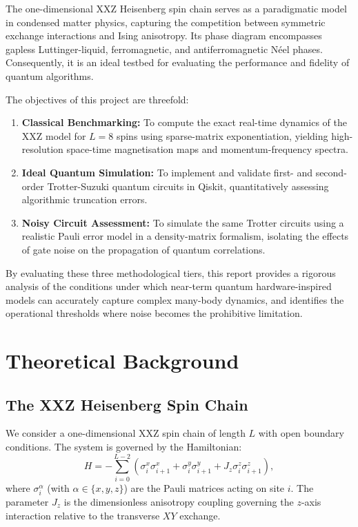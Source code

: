 \documentclass[11pt,a4paper]{article}
\begin{document}
The one-dimensional XXZ Heisenberg spin chain serves as a paradigmatic model in condensed matter physics, capturing the competition between symmetric exchange interactions and Ising anisotropy. Its phase diagram encompasses gapless Luttinger-liquid, ferromagnetic, and antiferromagnetic N\'eel phases. Consequently, it is an ideal testbed for evaluating the performance and fidelity of quantum algorithms.

The objectives of this project are threefold:
\begin{enumerate}
    \item \textbf{Classical Benchmarking:} To compute the exact real-time dynamics of the XXZ model for $L=8$ spins using sparse-matrix exponentiation, yielding high-resolution space-time magnetisation maps and momentum-frequency spectra.
    \item \textbf{Ideal Quantum Simulation:} To implement and validate first- and second-order Trotter-Suzuki quantum circuits in Qiskit, quantitatively assessing algorithmic truncation errors.
    \item \textbf{Noisy Circuit Assessment:} To simulate the same Trotter circuits using a realistic Pauli error model in a density-matrix formalism, isolating the effects of gate noise on the propagation of quantum correlations.
\end{enumerate}

By evaluating these three methodological tiers, this report provides a rigorous analysis of the conditions under which near-term quantum hardware-inspired models can accurately capture complex many-body dynamics, and identifies the operational thresholds where noise becomes the prohibitive limitation.

\section{Theoretical Background} \label{sec:theory}

\subsection{The XXZ Heisenberg Spin Chain}
We consider a one-dimensional XXZ spin chain of length $L$ with open boundary conditions. The system is governed by the Hamiltonian:
\begin{equation} \label{eq:hamiltonian}
H = -\sum_{i=0}^{L-2} \left( \sigma_i^x \sigma_{i+1}^x + \sigma_i^y \sigma_{i+1}^y + J_z \sigma_i^z \sigma_{i+1}^z \right),
\end{equation}
where $\sigma_i^\alpha$ (with $\alpha \in \{x,y,z\}$) are the Pauli matrices acting on site $i$. The parameter $J_z$ is the dimensionless anisotropy coupling governing the $z$-axis interaction relative to the transverse $XY$ exchange. 
\end{document}
